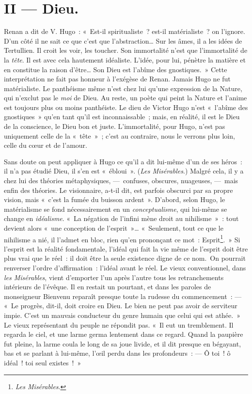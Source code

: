 \documentclass[french,twoside]{book} %
\begin{document}
\section[{II — Dieu.}]{II — Dieu.}
\noindent Renan a dit de V. Hugo : « Est-il spiritualiste ? est-il matérialiste ? on l’ignore. D’un côté il ne sait ce que c’est que l’abstraction… Sur les âmes, il a les idées de Tertullien. Il croit les voir, les toucher. Son immortalité n’est que l’immortalité de la \emph{tête}. Il est avec cela hautement idéaliste. L’idée, pour lui, pénètre la matière et en constitue la raison d’être… Son Dieu est l’abîme des gnostiques. » Cette interprétation ne fait pas honneur à l’exégèse de Renan. Jamais Hugo ne fut matérialiste. Le panthéisme même n’est chez lui qu’une expression de la Nature, qui n’exclut pas le \emph{moi} de Dieu. Au reste, un poète qui peint la Nature et l’anime est toujours plus ou moins panthéiste. Le dieu de Victor Hugo n’est « l’abîme des gnostiques » qu’en tant qu’il est inconnaissable ; mais, en réalité, il est le Dieu de la conscience, le Dieu bon et juste. L’immortalité, pour Hugo, n’est pas uniquement celle de la « tête » ; c’est au contraire, nous le verrons plus loin, celle du cœur et de l’amour.\par
Sans doute on peut appliquer à Hugo ce qu’il a dit lui-même d’un de ses héros : il n’a pas étudié Dieu, il s’en est « ébloui ». (\emph{Les Misérables}.) Malgré cela, il y a chez lui des théories métaphysiques, — confuses, obscures, nuageuses, — mais enfin des théories. Le visionnaire, a-t-il dit, est parfois obscurci par sa propre vision, mais « c’est la fumée du buisson ardent ». D’abord, selon Hugo, le matérialisme se fond nécessairement en un \emph{conceptualisme}, qui lui-même se change en \emph{idéalisme}. « La négation de l’infini mène droit au nihilisme » : tout devient alors « une conception de l’esprit »… « Seulement, tout ce que le nihilisme a nié, il l’admet en bloc, rien qu’en prononçant ce mot : Esprit\footnote{\emph{Les Misérables}.}. » Si l’esprit est la réalité fondamentale, l’idéal qui fait la vie même de l’esprit doit être plus vrai que le réel : il doit être la seule existence digne de ce nom. On pourrait renverser l’ordre d’affirmation : l’idéal avant le réel. Le vieux conventionnel, dans \emph{les Misérables}, vient d’emporter l’un après l’autre tous les retranchements intérieurs de l’évêque. Il en restait un pourtant, et dans les paroles de monseigneur Bienvenu reparaît presque toute la rudesse du commencement : — « Le progrès, dit-il, doit croire en Dieu. Le bien ne peut pas avoir de serviteur impie. C’est un mauvais conducteur du genre humain que celui qui est athée. » Le vieux représentant du peuple ne répondit pas. « Il eut un tremblement. Il regarda le ciel, et une larme germa lentement dans ce regard. Quand la paupière fut pleine, la larme coula le long de sa joue livide, et il dit presque en bégayant, bas et se parlant à lui-même, l’œil perdu dans les profondeurs : — Ô toi ! ô idéal ! toi seul existes ! »\par
\end{document}
